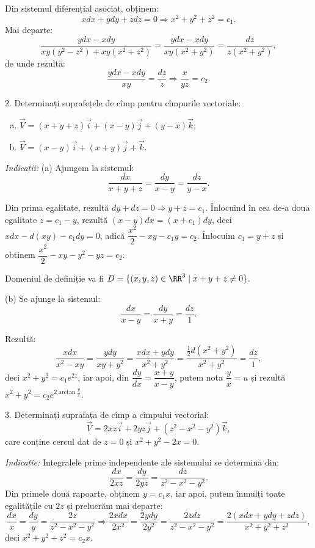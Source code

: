 Din sistemul diferențial asociat, obținem:
\[
  xdx + ydy + zdz = 0 \Rightarrow x^2 + y^2 + z^2 = c_1.
\]
Mai departe:
\[
  \dfrac{ydx - xdy}{xy(y^2 - z^2) + xy(x^2 + z^2)} = %
  \dfrac{ydx - xdy}{xy(x^2 + y^2)} = \dfrac{dz}{z(x^2 + y^2)},
\]
de unde rezultă:
\[
  \dfrac{ydx - xdy}{xy} = \dfrac{dz}{z} \Rightarrow \dfrac{x}{yz} = c_2.
\]

\vspace{1cm}

2. Determinați suprafețele de cîmp pentru cîmpurile vectoriale:
\begin{enumerate}[(a)]
\item $ \vec{V} = (x + y + z)\vec{i} + (x - y)\vec{j} + (y - x)\vec{k} $;
\item $ \vec{V} = (x - y)\vec{i} + (x + y) \vec{j} + \vec{k} $.
\end{enumerate}

\emph{Indicații:} (a) Ajungem la sistemul:
\[
  \dfrac{dx}{x + y + z} = \dfrac{dy}{x - y} = \dfrac{dz}{y - x}.
\]

Din prima egalitate, rezultă $ dy + dz = 0 \Rightarrow y + z = c_1 $. Înlocuind
în cea de-a doua egalitate $ z = c_1 - y $, rezultă $ (x - y)dx = (x + c_1)dy $,
deci $ xdx - d(xy) - c_1 dy = 0 $, adică $ \dfrac{x^2}{2} - xy - c_1y = c_2 $. Înlocuim
$ c_1 = y + z $ și obtinem $ \dfrac{x^2}{2} - xy - y^2 - yz = c_2 $.

Domeniul de definiție va fi $ D = \{ (x, y, z) \in \RR^3 \mid x + y + z \neq 0 \} $.

(b) Se ajunge la sistemul:
\[
  \dfrac{dx}{x - y} = \dfrac{dy}{x + y} = \dfrac{dz}{1}.
\]

Rezultă:
\[
  \dfrac{xdx}{x^2 - xy} = \dfrac{ydy}{xy + y^2} = \dfrac{xdx + ydy}{x^2 + y^2} = %
  \dfrac{\frac{1}{2} d(x^2 + y^2)}{x^2 + y^2} = \dfrac{dz}{1},
\]
deci $ x^2 + y^2 = c_1 e^{2z} $, iar apoi, din $ \dfrac{dy}{dx} = \dfrac{x + y}{x - y} $,
putem nota $ \dfrac{y}{x} = u $ și rezultă $ x^2 + y^2 = c_2 e^{2 \arctan \frac{y}{x}} $.

\vspace{1cm}

3. Determinați suprafața de cîmp a cîmpului vectorial:
\[
  \vec{V} = 2xz\vec{i} + 2yz\vec{j} + (z^2 - x^2 - y^2)\vec{k},
\]
care conține cercul dat de $ z = 0 $ și $ x^2 + y^2 - 2x = 0 $.

\emph{Indicație:} Integralele prime independente ale sistemului se
determină din:
\[
  \dfrac{dx}{2xz} = \dfrac{dy}{2yz} = \dfrac{dz}{z^2 - x^2 - y^2}.
\]
Din primele două rapoarte, obținem $ y = c_1 x $, iar apoi, putem înmulți
toate egalitățile cu $ 2z $ și prelucrăm mai departe:
\[
  \dfrac{dx}{x} = \dfrac{dy}{y} = \dfrac{2z}{z^2 - x^2 - y^2} \Rightarrow %
  \dfrac{2xdx}{2x^2} = \dfrac{2ydy}{2y^2} = \dfrac{2zdz}{z^2 - x^2 - y^2} = %
  \dfrac{2(xdx + ydy + zdz)}{x^2 + y^2 + z^2},
\]
deci $ x^2 + y^2 + z^2 = c_2 x $.

